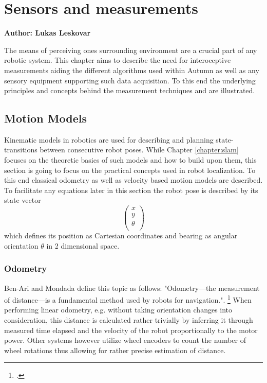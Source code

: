 \chapter{Sensors and measurements}

\textbf{Author: Lukas Leskovar} 

The means of perceiving ones surrounding environment are a crucial part of any robotic system. This chapter aims to describe the need for interoceptive measurements aiding the different algorithms used within Autumn as well as any sensory equipment supporting such data acquisition. To this end the underlying principles and concepts behind the measurement techniques and  are illustrated.

\section{Motion Models}
Kinematic models in robotics are used for describing and planning state-transitions between consecutive robot poses. While Chapter \ref{chapter:slam} focuses on the theoretic basics of such models and how to build upon them, this section is going to focus on the practical concepts used in robot localization. To this end classical odometry as well as velocity based motion models are described.
To facilitate any equations later in this section the robot pose is described by its state vector 
\[
\begin{pmatrix}
	x \\
	y \\
	\theta \\
\end{pmatrix}
\] 
which defines its position as Cartesian coordinates and bearing as angular orientation $\theta$ in 2 dimensional space. 

\subsection{Odometry}
Ben-Ari and Mondada define this topic as follows: "Odometry—the measurement of distance—is a fundamental method used by robots for navigation.". \footcite[Page 69]{ben2017elements} 
When performing linear odometry, e.g. without taking orientation changes into consideration, this distance is calculated rather trivially by inferring it through measured time elapsed and the velocity of the robot proportionally to the motor power. 
Other systems however utilize wheel encoders to count the number of wheel rotations thus allowing for rather precise estimation of distance. 

